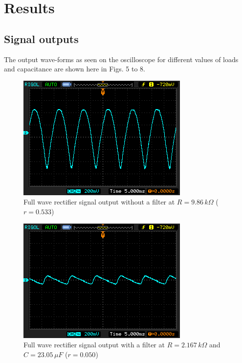 \section{Results}

\subsection{Signal outputs}
The output wave-forms as seen on the oscilloscope for different values of loads and capacitance are shown here in Figs. 5 to 8.

\begin{figure}[H]
    \centering
    \includegraphics[width=0.67\columnwidth]{images/03.png}
    \caption{Full wave rectifier signal output  without a filter at $R = 9.86\,k\Omega$ ($r=0.533$)}
\end{figure}

\begin{figure}[H]
    \centering
    \includegraphics[width=0.67\columnwidth]{images/11.png}
    \caption{Full wave rectifier signal output with a filter at $R = 2.167\,k\Omega$ and $C = 23.05\,\mu F$ ($r=0.050$)}
\end{figure}

